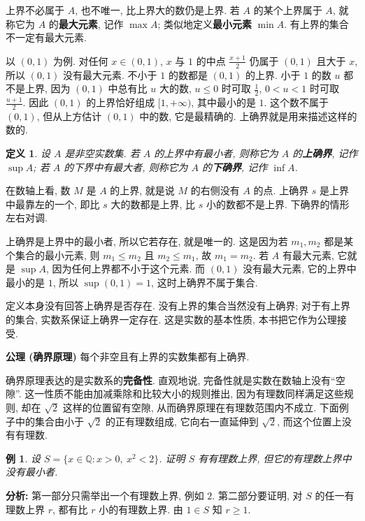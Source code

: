 \documentclass[UTF8,openany]{ctexbook}
\theoremstyle{chinesetextbook}
\newtheorem{definition}{定义}[section]
\newtheorem{example}{例}[section]
\begin{document}
上界不必属于 $A$, 也不唯一, 比上界大的数仍是上界. 若 $A$ 的某个上界属于 $A$, 就称它为 $A$ 的\textbf{最大元素}, 记作 $\max A$; 类似地定义\textbf{最小元素} $\min A$. 有上界的集合不一定有最大元素.

以 $(0,1)$ 为例. 对任何 $x\in(0,1)$, $x$ 与 $1$ 的中点 $\displaystyle\frac{x+1}2$ 仍属于 $(0,1)$ 且大于 $x$, 所以 $(0,1)$ 没有最大元素. 不小于 $1$ 的数都是 $(0,1)$ 的上界. 小于 $1$ 的数 $u$ 都不是上界, 因为 $(0,1)$ 中总有比 $u$ 大的数, $u\le0$ 时可取 $\displaystyle\frac12$, $0<u<1$ 时可取 $\displaystyle\frac{u+1}2$. 因此 $(0,1)$ 的上界恰好组成 $[1,+\infty)$, 其中最小的是 $1$. 这个数不属于 $(0,1)$, 但从上方估计 $(0,1)$ 中的数, 它是最精确的. 上确界就是用来描述这样的数的.
\begin{definition}
设 $A$ 是非空实数集. 若 $A$ 的上界中有最小者, 则称它为 $A$ 的\textbf{上确界}, 记作 $\sup A$; 若 $A$ 的下界中有最大者, 则称它为 $A$ 的\textbf{下确界}, 记作 $\inf A$.
\end{definition}
在数轴上看, 数 $M$ 是 $A$ 的上界, 就是说 $M$ 的右侧没有 $A$ 的点. 上确界 $s$ 是上界中最靠左的一个, 即比 $s$ 大的数都是上界, 比 $s$ 小的数都不是上界. 下确界的情形左右对调.

上确界是上界中的最小者, 所以它若存在, 就是唯一的. 这是因为若 $m_1,m_2$ 都是某个集合的最小元素, 则 $m_1\le m_2$ 且 $m_2\le m_1$, 故 $m_1=m_2$. 若 $A$ 有最大元素, 它就是 $\sup A$, 因为任何上界都不小于这个元素. 而 $(0,1)$ 没有最大元素, 它的上界中最小的是 $1$, 所以 $\sup(0,1)=1$, 这时上确界不属于集合.

定义本身没有回答上确界是否存在. 没有上界的集合当然没有上确界; 对于有上界的集合, 实数系保证上确界一定存在. 这是实数的基本性质, 本书把它作为公理接受.

\par\indent\textbf{公理 (确界原理)} 每个非空且有上界的实数集都有上确界.

确界原理表达的是实数系的\textbf{完备性}. 直观地说, 完备性就是实数在数轴上没有“空隙”. 这一性质不能由加减乘除和比较大小的规则推出, 因为有理数同样满足这些规则, 却在 $\sqrt2$ 这样的位置留有空隙, 从而确界原理在有理数范围内不成立. 下面例子中的集合由小于 $\sqrt2$ 的正有理数组成, 它向右一直延伸到 $\sqrt2$, 而这个位置上没有有理数.
\begin{example}
设 $S=\{x\in\mathbb Q:x>0,\ x^2<2\}$. 证明 $S$ 有有理数上界, 但它的有理数上界中没有最小者.
\end{example}
\par\indent\textbf{分析:} 第一部分只需举出一个有理数上界, 例如 $2$. 第二部分要证明, 对 $S$ 的任一有理数上界 $r$, 都有比 $r$ 小的有理数上界. 由 $1\in S$ 知 $r\ge1$.
\end{document}

